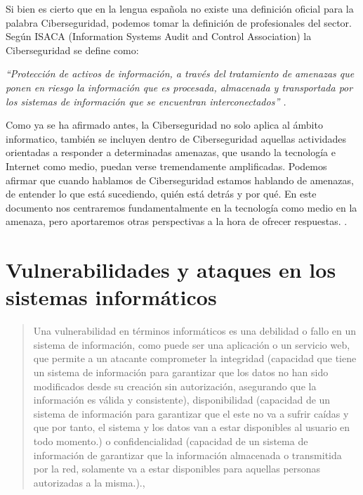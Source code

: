 Si bien es cierto que en la lengua española no existe una definición oficial para la palabra Ciberseguridad, podemos 
tomar la definición de profesionales del sector. Según ISACA (Information Systems Audit and Control Association) la 
Ciberseguridad se define como:

\emph{“Protección de activos de información, a través del tratamiento de amenazas que ponen en riesgo la información 
que es procesada, almacenada y transportada por los sistemas de información que se encuentran interconectados” \cite{bsecure}.}

Como ya se ha afirmado antes, la Ciberseguridad no solo aplica al ámbito informatico, también se incluyen dentro de Ciberseguridad 
aquellas actividades orientadas a responder a determinadas amenazas, que usando la tecnología e Internet como medio, puedan 
verse tremendamente amplificadas. Podemos afirmar que cuando hablamos de Ciberseguridad estamos hablando de amenazas, 
de entender lo que está sucediendo, quién está detrás y por qué. En este documento nos centraremos fundamentalmente en la 
tecnología como medio en la amenaza, pero aportaremos otras perspectivas a la hora de ofrecer respuestas. \nocite{pwc}.




\chapter{Vulnerabilidades y ataques en los sistemas informáticos}
\label{cha:vulneravilidades-y-ataques}


\begin{quote}

\small Una vulnerabilidad en términos informáticos es una debilidad o fallo en un sistema de información, como puede ser una aplicación o un servicio web, que permite a un atacante comprometer la integridad (capacidad que tiene un sistema de información para garantizar que los datos no han sido modificados desde su creación sin autorización, asegurando que la información es válida y consistente), disponibilidad (capacidad de un sistema de información para garantizar que el este no va a sufrir caídas y que por tanto, el sistema y los datos van a  estar disponibles al usuario en todo momento.) o confidencialidad (capacidad de un sistema de información de garantizar que la información almacenada o transmitida por la red, solamente va a estar disponibles para aquellas personas autorizadas a la misma.).\cite{incibe},\cite{infosegur} 

\end{quote}

